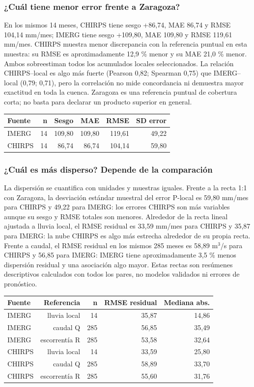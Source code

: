 \documentclass[10pt,a4paper]{article}
\begin{document}
\subsubsection*{¿Cuál tiene menor error frente a Zaragoza?}
En los mismos 14 meses, CHIRPS tiene sesgo +86,74, MAE 86,74 y RMSE 104,14 mm/mes; IMERG tiene sesgo +109,80, MAE 109,80 y RMSE 119,61 mm/mes. CHIRPS muestra menor discrepancia con la referencia puntual en esta muestra: su RMSE es aproximadamente 12,9 \% menor y su MAE 21,0 \% menor. Ambos sobreestiman todos los acumulados locales seleccionados. La relación CHIRPS--local es algo más fuerte (Pearson 0,82; Spearman 0,75) que IMERG--local (0,79; 0,71), pero la correlación no mide concordancia ni demuestra mayor exactitud en toda la cuenca. Zaragoza es una referencia puntual de cobertura corta; no basta para declarar un producto superior en general.
\begin{center}\small\begin{tabular}{lrrrrr}\hline
Fuente & n & Sesgo & MAE & RMSE & SD error \\ \hline
IMERG & 14 & 109,80 & 109,80 & 119,61 & 49,22 \\
CHIRPS & 14 & 86,74 & 86,74 & 104,14 & 59,80 \\
\hline\end{tabular}\end{center}
\subsubsection*{¿Cuál es más disperso? Depende de la comparación}
La dispersión se cuantifica con unidades y muestras iguales. Frente a la recta 1:1 con Zaragoza, la desviación estándar muestral del error P-local es 59,80 mm/mes para CHIRPS y 49,22 para IMERG: los errores CHIRPS son más variables aunque su sesgo y RMSE totales son menores. Alrededor de la recta lineal ajustada a lluvia local, el RMSE residual es 33,59 mm/mes para CHIRPS y 35,87 para IMERG: la nube CHIRPS es algo más estrecha alrededor de su propia recta. Frente a caudal, el RMSE residual en los mismos 285 meses es 58,89 m$^3$/s para CHIRPS y 56,85 para IMERG: IMERG tiene aproximadamente 3,5 \% menos dispersión residual y una asociación algo mayor. Estas rectas son resúmenes descriptivos calculados con todos los pares, no modelos validados ni errores de pronóstico.
\begin{center}\small\begin{tabular}{lrrrr}\hline
Fuente & Referencia & n & RMSE residual & Mediana abs. \\ \hline
IMERG & lluvia local & 14 & 35,87 & 14,86 \\
IMERG & caudal Q & 285 & 56,85 & 35,49 \\
IMERG & escorrentía R & 285 & 53,58 & 32,64 \\
CHIRPS & lluvia local & 14 & 33,59 & 25,80 \\
CHIRPS & caudal Q & 285 & 58,89 & 33,70 \\
CHIRPS & escorrentía R & 285 & 55,60 & 31,76 \\
\hline\end{tabular}\end{center}
\end{document}
